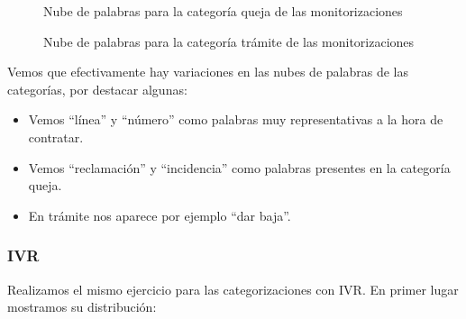        \begin{figure}[!ht]
           	\centering
           	
           	
               \caption{Nube de palabras para la categoría queja de las monitorizaciones}
               \label{fig:cloudmoni_queja}
           \end{figure}     
    
    
    \begin{figure}[!ht]
               	\centering
               	
               	
                   \caption{Nube de palabras para la categoría trámite de las monitorizaciones}
                   \label{fig:cloudmoni_tram}
 \end{figure}     
    
   
    Vemos que efectivamente hay variaciones en las nubes de palabras de las
categorías, por destacar algunas:
\begin{itemize}
\item Vemos ``línea'' y ``número'' como palabras muy representativas a la hora
de contratar.

\item Vemos ``reclamación'' y ``incidencia'' como palabras presentes en la
categoría queja.

\item En trámite nos aparece por ejemplo ``dar baja''.
\end{itemize}
    \hypertarget{ivr}{%
\subsubsection{IVR}\label{ivr}}

    Realizamos el mismo ejercicio para las categorizaciones con IVR. En
primer lugar mostramos su distribución:

